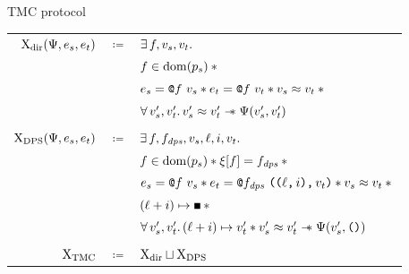 \begin{frame}{TMC protocol}
\begin{tabular}{rcl}
        $\iProt_\mathrm{dir} (\iPredTwo, \datalangExpr_s, \datalangExpr_t)$
        & $\coloneqq$ &
        $\exists \datalangFn, \datalangVal_s, \datalangVal_t \ldotp$
    \\
        &&
        $\datalangFn \in \dom{\datalangProg_s} \iSep {}$
    \\
        &&
        $\datalangExpr_s = \datalangCall{\datalangFnptr{\datalangFn}}{\datalangVal_s} \iSep
        \datalangExpr_t = \datalangCall{\datalangFnptr{\datalangFn}}{\datalangVal_t} \iSep
        \datalangVal_s \iSimilar \datalangVal_t \iSep {}$
    \\
        &&
        $\forall \datalangVal_s', \datalangVal_t' \ldotp
        \datalangVal_s' \iSimilar \datalangVal_t' \iWand
        \iPredTwo (\datalangVal_s', \datalangVal_t')$
    \\\\
        $\iProt_\mathrm{DPS} (\iPredTwo, \datalangExpr_s, \datalangExpr_t)$
        & $\coloneqq$ &
        $\exists \datalangFn, \datalangFn_\mathit{dps}, \datalangVal_s, \datalangLoc, \datalangIdx, \datalangVal_t \ldotp$
    \\
        &&
        $\datalangFn \in \dom{\datalangProg_s} \iSep
        \datalangRenaming [\datalangFn] = \datalangFn_\mathit{dps} \iSep {}$
    \\
        &&
        $\datalangExpr_s = \datalangCall{\datalangFnptr{\datalangFn}}{\datalangVal_s} \iSep
        \datalangExpr_t = \datalangCall{\datalangFnptr{\datalangFn_\mathit{dps}}}{\datalangPair{\datalangPair{\datalangLoc}{\datalangIdx}}{\datalangVal_t}} \iSep
        \datalangVal_s \iSimilar \datalangVal_t \iSep {}$
    \\
        &&
        $(\datalangLoc + \datalangIdx) \iPointsto \datalangHole \iSep {}$
    \\
        &&
        $\forall \datalangVal_s', \datalangVal_t' \ldotp
        (\datalangLoc + \datalangIdx) \iPointsto \datalangVal_t' \iSep
        \datalangVal_s' \iSimilar \datalangVal_t' \iWand
        \iPredTwo (\datalangVal_s', \datalangUnit)$
    \\\\
        $\mathrm{X}_\mathrm{TMC}$
        & $\coloneqq$ &
        $\mathrm{X}_\mathrm{dir} \sqcup \mathrm{X}_\mathrm{DPS}$
\end{tabular}
\end{frame}
